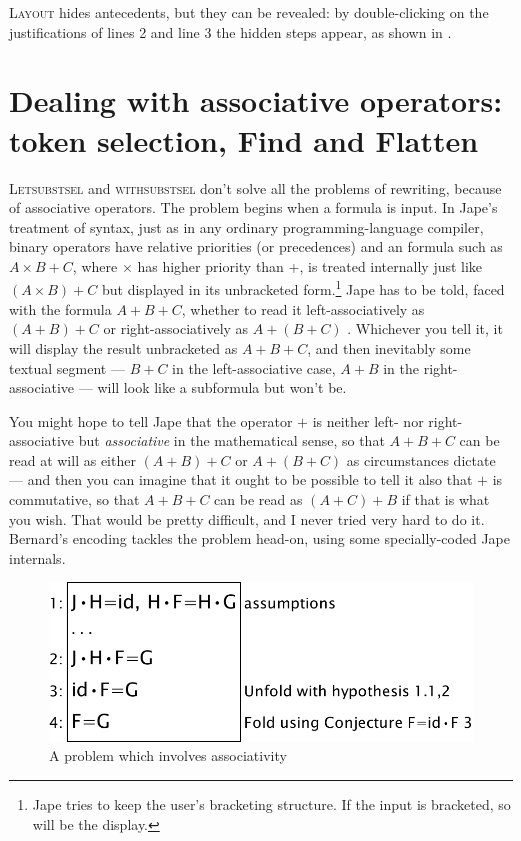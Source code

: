 \textsc{Layout} hides antecedents, but they can be revealed: by double-clicking on the justifications of lines 2 and line 3 the hidden steps appear, as shown in .

\section{Dealing with associative operators: token selection, Find and Flatten}
\label{sec:funcprog:tokenselection}

\textsc{Letsubstsel} and \textsc{withsubstsel} don't solve all the problems of rewriting, because of associative operators. The problem begins when a formula is input. In Jape's treatment of syntax, just as in any ordinary programming-language compiler, binary operators have relative priorities (or precedences) and an formula such as $A\times B+C$, where \ensuremath{\times} has higher priority than +, is treated internally just like $(A\times B)+C$ but displayed in its unbracketed form.\footnote{Jape tries to keep the user's bracketing structure. If the input is bracketed, so will be the display.} Jape has to be told, faced with the formula $A+B+C$, whether to read it left-associatively as $(A+B)+C$ or right-associatively as $A+(B+C)$ . Whichever you tell it, it will display the result unbracketed as $A+B+C$, and then inevitably some textual segment --- $B+C$ in the left-associative case, $A+B$ in the right-associative --- will look like a subformula but won't be.

You might hope to tell Jape that the operator $+$ is neither left- nor right-associative but \textit{associative} in the mathematical sense, so that $A+B+C$ can be read at will as either $(A+B)+C$ or $A+(B+C)$ as circumstances dictate --- and then you can imagine that it ought to be possible to tell it also that $+$ is commutative, so that $A+B+C$ can be read as $(A+C)+B$ if that is what you wish. That would be pretty difficult, and I never tried very hard to do it. Bernard's encoding tackles the problem head-on, using some specially-coded Jape internals.

\begin{figure}
\centering
\includegraphics[scale=0.5]{pics/funcprog/assocprobA}
\caption{A problem which involves associativity}
\label{fig:funcprog:assocprobA}
\end{figure}

